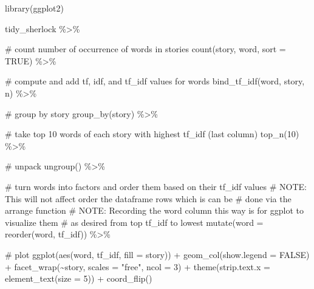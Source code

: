 \documentclass[
  letterpaper,
  DIV=11,
  numbers=noendperiod]{scrreprt}
\newenvironment{Shaded}{\begin{snugshade}}{\end{snugshade}}
\newcommand{\AlertTok}[1]{\textcolor[rgb]{0.68,0.00,0.00}{#1}}
\newcommand{\AttributeTok}[1]{\textcolor[rgb]{0.40,0.45,0.13}{#1}}
\newcommand{\CommentTok}[1]{\textcolor[rgb]{0.37,0.37,0.37}{#1}}
\newcommand{\ConstantTok}[1]{\textcolor[rgb]{0.56,0.35,0.01}{#1}}
\newcommand{\DecValTok}[1]{\textcolor[rgb]{0.68,0.00,0.00}{#1}}
\newcommand{\FunctionTok}[1]{\textcolor[rgb]{0.28,0.35,0.67}{#1}}
\newcommand{\NormalTok}[1]{\textcolor[rgb]{0.00,0.23,0.31}{#1}}
\newcommand{\SpecialCharTok}[1]{\textcolor[rgb]{0.37,0.37,0.37}{#1}}
\newcommand{\StringTok}[1]{\textcolor[rgb]{0.13,0.47,0.30}{#1}}
\begin{document}
\begin{Shaded}
\begin{Highlighting}[]
\FunctionTok{library}\NormalTok{(ggplot2)}

\NormalTok{tidy\_sherlock }\SpecialCharTok{\%\textgreater{}\%} 
  
  \CommentTok{\# count number of occurrence of words in stories}
  \FunctionTok{count}\NormalTok{(story, word, }\AttributeTok{sort =} \ConstantTok{TRUE}\NormalTok{) }\SpecialCharTok{\%\textgreater{}\%} 
  
  \CommentTok{\# compute and add tf, idf, and tf\_idf values for words}
  \FunctionTok{bind\_tf\_idf}\NormalTok{(word, story, n) }\SpecialCharTok{\%\textgreater{}\%} 
  
  \CommentTok{\# group by story}
  \FunctionTok{group\_by}\NormalTok{(story) }\SpecialCharTok{\%\textgreater{}\%} 
  
  \CommentTok{\# take top 10 words of each story with highest tf\_idf (last column)}
  \FunctionTok{top\_n}\NormalTok{(}\DecValTok{10}\NormalTok{) }\SpecialCharTok{\%\textgreater{}\%} 
  
  \CommentTok{\# unpack}
  \FunctionTok{ungroup}\NormalTok{() }\SpecialCharTok{\%\textgreater{}\%} 
  
  \CommentTok{\# turn words into factors and order them based on their tf\_idf values}
  \CommentTok{\# }\AlertTok{NOTE}\CommentTok{: This will not affect order the dataframe rows which is can be}
  \CommentTok{\#   done via the arrange function}
  \CommentTok{\# }\AlertTok{NOTE}\CommentTok{: Recording the word column this way is for ggplot to visualize them}
  \CommentTok{\#   as desired from top tf\_idf to lowest}
  \FunctionTok{mutate}\NormalTok{(}\AttributeTok{word =} \FunctionTok{reorder}\NormalTok{(word, tf\_idf)) }\SpecialCharTok{\%\textgreater{}\%} 
  
  \CommentTok{\# plot}
  \FunctionTok{ggplot}\NormalTok{(}\FunctionTok{aes}\NormalTok{(word, tf\_idf, }\AttributeTok{fill =}\NormalTok{ story)) }\SpecialCharTok{+}
  \FunctionTok{geom\_col}\NormalTok{(}\AttributeTok{show.legend =} \ConstantTok{FALSE}\NormalTok{) }\SpecialCharTok{+}
  \FunctionTok{facet\_wrap}\NormalTok{(}\SpecialCharTok{\textasciitilde{}}\NormalTok{story, }\AttributeTok{scales =} \StringTok{"free"}\NormalTok{, }\AttributeTok{ncol =} \DecValTok{3}\NormalTok{) }\SpecialCharTok{+}
  \FunctionTok{theme}\NormalTok{(}\AttributeTok{strip.text.x =} \FunctionTok{element\_text}\NormalTok{(}\AttributeTok{size =} \DecValTok{5}\NormalTok{)) }\SpecialCharTok{+}
  \FunctionTok{coord\_flip}\NormalTok{()}
\end{Highlighting}
\end{Shaded}
\end{document}
